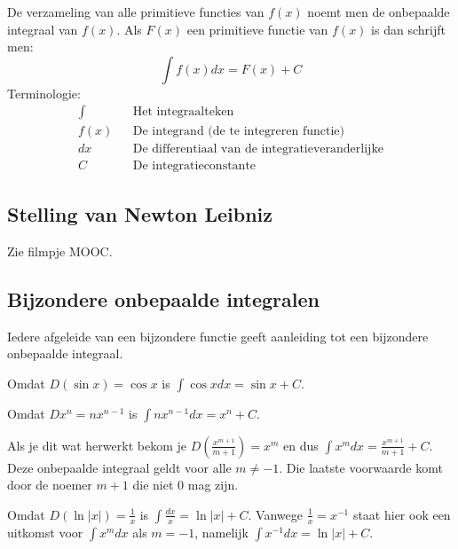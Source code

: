 \begin{definitie}
De verzameling van alle primitieve functies van $f(x)$ noemt men de onbepaalde integraal van $f(x)$. 
Als $F(x)$ een primitieve functie van $f(x)$ is dan schrijft men:
\begin{equation*}
\int f(x)dx = F(x) + C
\end{equation*}
Terminologie:
\begin{eqnarray*}
\int && \text{Het integraalteken} \\
f(x) && \text{De integrand (de te integreren functie)} \\
dx && \text{De differentiaal van de integratieveranderlijke} \\
C && \text{De integratieconstante }
\end{eqnarray*}
\end{definitie}

\subsection{Stelling van Newton Leibniz}
Zie filmpje MOOC.

\subsection{Bijzondere onbepaalde integralen}

Iedere afgeleide van een bijzondere functie geeft aanleiding tot een bijzondere onbepaalde integraal.

\begin{voorbeeld} Omdat $D(\sin x)=\cos x$ is $\int \cos x dx = \sin x +C$.
\end{voorbeeld}

\begin{voorbeeld} Omdat $Dx^n=nx^{n-1}$ is $\int nx^{n-1}dx = x^n +C$.
	
Als je dit wat herwerkt bekom je $D \left( \frac{x^{m+1}}{m+1} \right) = x^m$ en dus $\int x^mdx=\frac{x^{m+1}}{m+1} + C$.
Deze onbepaalde integraal geldt voor alle $m \neq -1$.
Die laatste voorwaarde komt door de noemer $m+1$ die niet 0 mag zijn.
\end{voorbeeld}

\begin{voorbeeld} Omdat $D(\ln\vert x \vert)=\frac{1}{x}$ is $\int \frac{dx}{x} = \ln \vert x \vert +C$.
Vanwege $\frac{1}{x} = x^{-1}$ staat hier ook een uitkomst voor $\int x^m dx$ als $m=-1$, namelijk $\int x^{-1} dx = \ln \vert x \vert +C$.
\end{voorbeeld}

